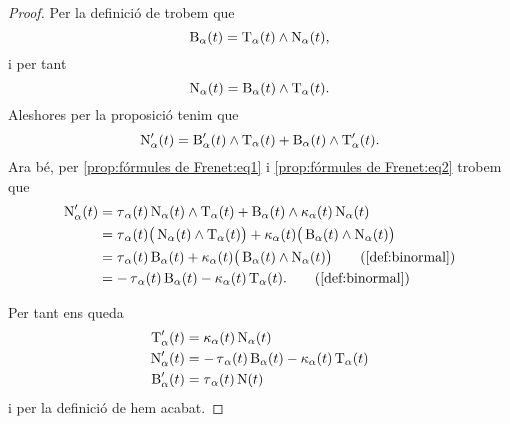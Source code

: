 \documentclass[../Apunts.tex]{subfiles}
\begin{document}
\begin{proposition}
\begin{proof}
			Per la definició de  trobem que
			\[\operatorname{B}_{\alpha}(t)=\operatorname{T}_{\alpha}(t)\mathbin{\wedge}\operatorname{N}_{\alpha}(t),\]
			i per tant %
			\[\operatorname{N}_{\alpha}(t)=\operatorname{B}_{\alpha}(t)\mathbin{\wedge}\operatorname{T}_{\alpha}(t).\]
			Aleshores per la proposició  tenim que
			\[\operatorname{N}'_{\alpha}(t)=\operatorname{B}'_{\alpha}(t)\mathbin{\wedge}\operatorname{T}_{\alpha}(t)+\operatorname{B}_{\alpha}(t)\mathbin{\wedge}\operatorname{T}'_{\alpha}(t).\]
			Ara bé, per \eqref{prop:fórmules de Frenet:eq1} i \eqref{prop:fórmules de Frenet:eq2} trobem que
			\begin{align*}
				\normal'_{\alpha}(t)&=\torsio_{\alpha}(t)\normal_{\alpha}(t)\prodvec\tangent_{\alpha}(t)+\binormal_{\alpha}(t)\prodvec\curvatura_{\alpha}(t)\normal_{\alpha}(t) \\
				&=\torsio_{\alpha}(t)\big(\normal_{\alpha}(t)\prodvec\tangent_{\alpha}(t)\big)+\curvatura_{\alpha}(t)\big(\binormal_{\alpha}(t)\prodvec\normal_{\alpha}(t)\big) \\ %
				&=\torsio_{\alpha}(t)\binormal_{\alpha}(t)+\curvatura_{\alpha}(t)\big(\binormal_{\alpha}(t)\prodvec\normal_{\alpha}(t)\big) \tag{\ref{def:binormal}} \\
				&=-\torsio_{\alpha}(t)\binormal_{\alpha}(t)-\curvatura_{\alpha}(t)\tangent_{\alpha}(t). \tag{\ref{def:binormal}}
			\end{align*}
			
			Per tant ens queda
			\begin{align*}
				\operatorname{T}_{\alpha}'(t)&=\operatorname{\kappa}_{\alpha}(t)\operatorname{N}_{\alpha}(t) \\
				\operatorname{N}'_{\alpha}(t)&=-\operatorname{\tau}_{\alpha}(t)\operatorname{B}_{\alpha}(t)-\operatorname{\kappa}_{\alpha}(t)\operatorname{T}_{\alpha}(t) \\
				\operatorname{B}'_{\alpha}(t)&=\operatorname{\tau}_{\alpha}(t)\operatorname{N}(t)
			\end{align*}
			i per la definició de  hem acabat.
		\end{proof}
	\end{proposition}
\end{document}
